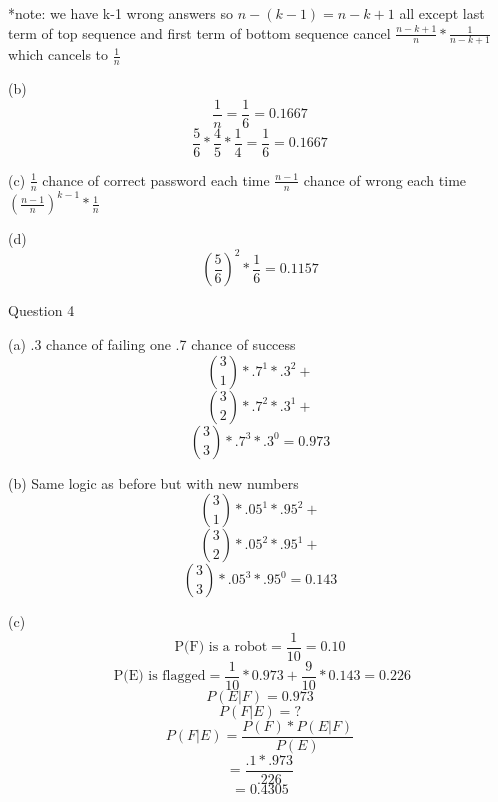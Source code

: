 \documentclass[12pt]{article}
\begin{document}
\begin{flushleft}
	*note: we have k-1 wrong answers so  $n - (k-1) = n - k + 1$
	all except last term of top sequence and first term of bottom sequence cancel
	$\frac{n-k+1}{n}*\frac{1}{n-k+1}$ which cancels to \newline
	$\frac{1}{n}$
	
	(b)
	\[ \frac{1}{n} = \frac{1}{6} = 0.1667 \]
	\[ \frac{5}{6}*\frac{4}{5}*\frac{1}{4} = \frac{1}{6} = 0.1667 \]
	
	(c)
	$\frac{1}{n}$ chance of correct password each time  \newline
	$\frac{n-1}{n}$ chance of wrong each time \newline
	$\left(\frac{n-1}{n}\right)^{k-1}*\frac{1}{n}$
	
	(d)
		\[ \left(\frac{5}{6}\right)^2*\frac{1}{6} = 0.1157 \]
		
Question 4

	(a)
	.3 chance of failing one \newline
	.7 chance of success \newline
	\[ \binom{3}{1}*.7^1*.3^2 + \]
	\[ \binom{3}{2}*.7^2*.3^1 + \]
	\[ \binom{3}{3}*.7^3*.3^0 = 0.973 \]
	
	(b) Same logic as before but with new numbers
	\[ \binom{3}{1}*.05^1*.95^2 + \] 
	\[ \binom{3}{2}*.05^2*.95^1 + \]
	\[ \binom{3}{3}*.05^3*.95^0 = 0.143 \]
	
	(c) \[ \text{P(F) is a robot} = \frac{1}{10} = 0.10 \]
		\[\text{ P(E) is flagged} = \frac{1}{10}*0.973 + \frac{9}{10}*0.143 = 0.226 \]
		\[ P(E \vert F) = 0.973 \]
		\[ P(F \vert E) = ? \]
		\[P(F \vert E) = \frac{P(F)*P(E \vert F)}{P(E)} \]
				\[ = \frac{.1*.973}{.226} \]
				\[ = 0.4305 \]
		
		
		
\end{flushleft}
\end{document}
